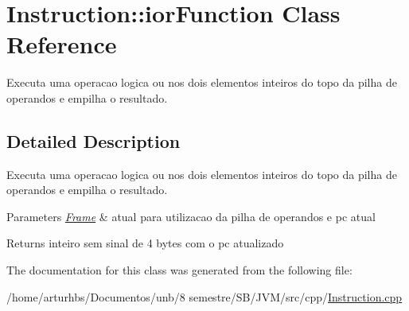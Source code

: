 \hypertarget{classInstruction_1_1iorFunction}{}\section{Instruction\+:\+:ior\+Function Class Reference}
\label{classInstruction_1_1iorFunction}


Executa uma operacao logica \textquotesingle{}ou\textquotesingle{} nos dois elementos inteiros do topo da pilha de operandos e empilha o resultado.  




\subsection{Detailed Description}
Executa uma operacao logica \textquotesingle{}ou\textquotesingle{} nos dois elementos inteiros do topo da pilha de operandos e empilha o resultado. 


\begin{DoxyParams}{Parameters}
{\em \hyperlink{classFrame}{Frame}} & atual para utilizacao da pilha de operandos e pc atual \\
\hline
\end{DoxyParams}
\begin{DoxyReturn}{Returns}
inteiro sem sinal de 4 bytes com o pc atualizado 
\end{DoxyReturn}


The documentation for this class was generated from the following file\+:\begin{DoxyCompactItemize}
\item 
/home/arturhbs/\+Documentos/unb/8 semestre/\+S\+B/\+J\+V\+M/src/cpp/\hyperlink{Instruction_8cpp}{Instruction.\+cpp}\end{DoxyCompactItemize}

